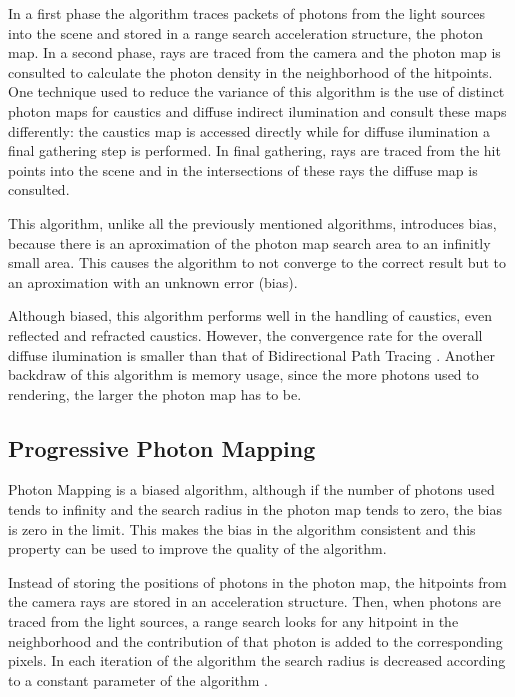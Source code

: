 In a first phase the algorithm traces packets of photons from the light sources into the scene and stored in a range search acceleration structure, the photon map. In a second phase, rays are traced from the camera and the photon map is consulted to calculate the photon density in the neighborhood of the hitpoints. One technique used to reduce the variance of this algorithm is the use of distinct photon maps for caustics and diffuse indirect ilumination and consult these maps differently: the caustics map is accessed directly while for diffuse ilumination a final gathering step is performed. In final gathering, rays are traced from the hit points into the scene and in the intersections of these rays the diffuse map is consulted.

This algorithm, unlike all the previously mentioned algorithms, introduces bias, because there is an aproximation of the photon map search area to an infinitly small area. This causes the algorithm to not converge to the correct result but to an aproximation with an unknown error (bias).

Although biased, this algorithm performs well in the handling of caustics, even reflected and refracted caustics. However, the convergence rate for the overall diffuse ilumination is smaller than that of Bidirectional Path Tracing \citep{Georgiev}. Another backdraw of this algorithm is memory usage, since the more photons used to rendering, the larger the photon map has to be.

\subsection{Progressive Photon Mapping}

Photon Mapping is a biased algorithm, although if the number of photons used tends to infinity and the search radius in the photon map tends to zero, the bias is zero in the limit. This makes the bias in the algorithm consistent and this property can be used to improve the quality of the algorithm.

Instead of storing the positions of photons in the photon map, the hitpoints from the camera rays are stored in an acceleration structure. Then, when photons are traced from the light sources, a range search looks for any hitpoint in the neighborhood and the contribution of that photon is added to the corresponding pixels. In each iteration of the algorithm the search radius is decreased according to a constant parameter of the algorithm \citep{Hachisuka}.

